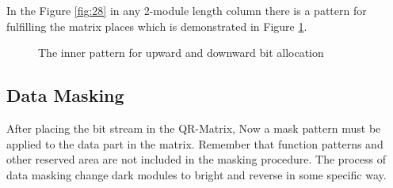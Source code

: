 In the Figure \ref{fig:28} in any 2-module length column there is a pattern for fulfilling the matrix places which is demonstrated in Figure \ref{fig29}.
\begin{figure}[ht!]
     \begin{center}
%
    \end{center}
    \caption{%
The inner pattern for upward and downward bit allocation\cite{Thonky}
     }%
   \label{fig29}
\end{figure}

\subsection{Data Masking}

After placing the bit stream in the QR-Matrix, Now a mask pattern must be applied to the data part in the matrix. Remember that function patterns and other reserved area are not included in the masking procedure. The process of data masking change dark modules to bright and reverse in some specific way. 

